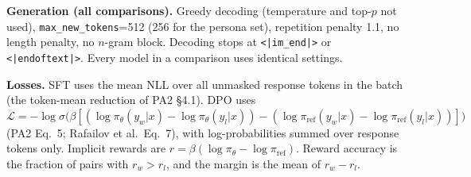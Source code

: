 \documentclass[10pt,a4paper]{article}
\begin{document}
\textbf{Generation (all comparisons).} Greedy decoding (temperature and top-$p$ not used), \texttt{max\_new\_tokens}=512 (256 for the persona set), repetition penalty 1.1, no length penalty, no $n$-gram block. Decoding stops at \texttt{<|im\_end|>} or \texttt{<|endoftext|>}. Every model in a comparison uses identical settings.

\textbf{Losses.} SFT uses the mean NLL over all unmasked response tokens in the batch (the token-mean reduction of PA2 \S4.1). DPO uses $\mathcal{L}=-\log\sigma\big(\beta[(\log\pi_\theta(y_w|x)-\log\pi_\theta(y_l|x))-(\log\pi_{\text{ref}}(y_w|x)-\log\pi_{\text{ref}}(y_l|x))]\big)$ (PA2 Eq.~5; Rafailov et al.\ Eq.~7), with log-probabilities summed over response tokens only. Implicit rewards are $r=\beta(\log\pi_\theta-\log\pi_{\text{ref}})$. Reward accuracy is the fraction of pairs with $r_w>r_l$, and the margin is the mean of $r_w-r_l$.

\end{document}
